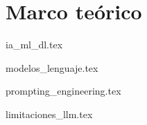 \chapter{Marco teórico}



{ia_ml_dl.tex}

{modelos_lenguaje.tex}

{prompting_engineering.tex}

{limitaciones_llm.tex}







